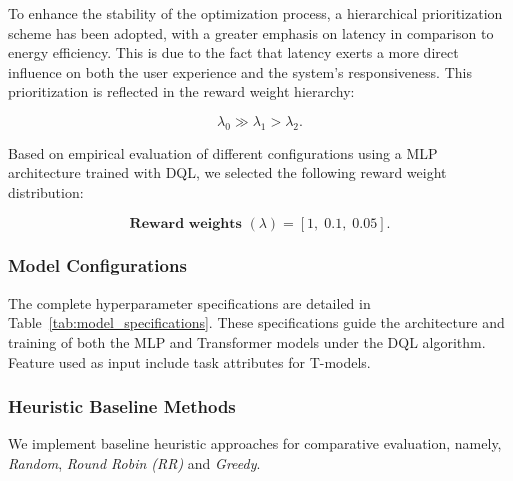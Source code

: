 \documentclass{svproc}
\begin{document}
To enhance the stability of the optimization process, a hierarchical prioritization scheme has been adopted, with a greater emphasis on latency in comparison to energy efficiency. This is due to the fact that latency exerts a more direct influence on both the user experience and the system's responsiveness. This prioritization is reflected in the reward weight hierarchy:

\[
\lambda_0 \gg \lambda_1 > \lambda_2.
\]

Based on empirical evaluation of different configurations using a MLP architecture trained with DQL, we selected the following reward weight distribution:

\[
\textbf{Reward weights } (\lambda) = [1,\; 0.1,\; 0.05].
\]


\subsubsection{Model Configurations}

The complete hyperparameter specifications are detailed in Table~\ref{tab:model_specifications}. These specifications guide the architecture and training of both the MLP and Transformer models under the DQL algorithm. Feature used as input include task attributes for T-models.


\begin{table}[H]
\centering

\caption{Model Specifications}\label{tab:model_specifications}
\end{table}

\subsubsection{Heuristic Baseline Methods}\label{subsubsec:heuristic_baselines}
We implement baseline heuristic approaches for comparative evaluation, namely, \emph{Random}, \emph{Round Robin (RR)} and \emph{Greedy}.
\end{document}
